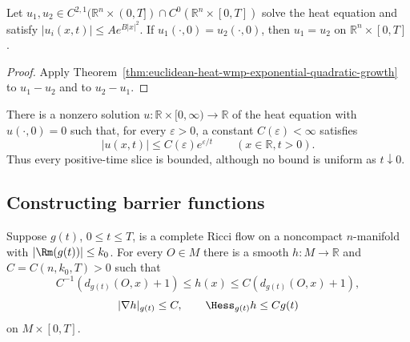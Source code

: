 \begin{theorem}
\label{thm:euclidean-heat-uniqueness-exponential-quadratic-growth}
Let $u_1,u_2\in C^{2,1}(\mathbb R^n\times(0,T])\cap
C^0(\mathbb R^n\times[0,T])$ solve the heat equation and satisfy
$|u_i(x,t)|\leq Ae^{B|x|^2}$.  If $u_1(\cdot,0)=u_2(\cdot,0)$, then
$u_1=u_2$ on $\mathbb R^n\times[0,T]$.
\end{theorem}

\begin{proof}
\sketch
{}
Apply Theorem~\ref{thm:euclidean-heat-wmp-exponential-quadratic-growth} to
$u_1-u_2$ and to $u_2-u_1$.
\end{proof}

\begin{theorem}
\label{thm:heat-nonuniqueness-slicewise-bounded}
There is a nonzero solution $u:\mathbb R\times[0,\infty)\to\mathbb R$ of the
heat equation with $u(\cdot,0)=0$ such that, for every $\varepsilon>0$, a
constant $C(\varepsilon)<\infty$ satisfies
\[
|u(x,t)|\leq C(\varepsilon)e^{\varepsilon/t}
\qquad(x\in\mathbb R, t>0).
\]
Thus every positive-time slice is bounded, although no bound is uniform as
$t\downarrow0$.
\end{theorem}

\subsection{Constructing barrier functions}

\begin{lemma}
\label{lem:ricci-flow-distance-like-function}
Suppose $g(t)$, $0\leq t\leq T$, is a complete Ricci flow on a noncompact
$n$-manifold with $|\Rm(g(t))|\leq k_0$.  For every $O\in M$ there is a smooth
$h:M\to\mathbb R$ and $C=C(n,k_0,T)>0$ such that
\[
C^{-1}(d_{g(t)}(O,x)+1)\leq h(x)\leq C(d_{g(t)}(O,x)+1),
\]
\[
|\nabla h|_{g(t)}\leq C,\qquad \Hess_{g(t)}h\leq Cg(t)
\]
on $M\times[0,T]$.
\end{lemma}

